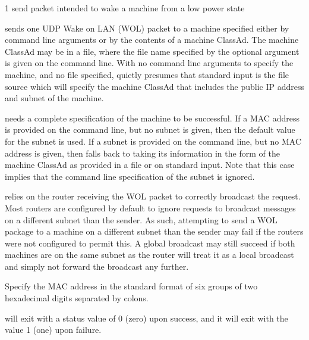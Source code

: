 \begin{ManPage}{\label{man-condor-power}}{1}
{send packet intended to wake a machine from a low power state}
\Synopsis 
{}




\Description

 sends one UDP Wake on LAN (WOL) packet to a machine
specified either by command line arguments or by the contents
of a machine ClassAd.
The machine ClassAd may be in a file, where the 
file name specified by the optional argument  
is given on the command line.
With no command line arguments to specify the machine,
and no file specified,  quietly presumes that standard input
is the file source which will
specify the machine ClassAd that includes the public IP address
and subnet of the machine.

 needs a complete specification of the machine to
be successful.
If a MAC address is provided on the command line, but no subnet is given,
then the default value for the subnet is used.
If a subnet is provided on the command line, but no MAC address is given,
then  falls back to taking its information in the form
of the machine ClassAd as provided in a file or on standard input.
Note that this case implies that the command line specification of the 
subnet is ignored.

 relies on the router receiving the WOL packet to correctly
broadcast the request. Most routers are configured by default to ignore
requests to broadcast messages on a different subnet than the sender. As
such, attempting to send a WOL package to a machine on a different subnet
than the sender may fail if the routers were not configured to permit this.
A global broadcast may still succeed if both machines are on the same subnet
as the router will treat it as a local broadcast and simply not forward
the broadcast any further.

\begin{Options}
   {Specify the MAC address in the standard
    format of six groups of two hexadecimal digits separated by colons. }

\end{Options}

\ExitStatus

 will exit with a status value of 0 (zero) upon success,
and it will exit with the value 1 (one) upon failure.

\end{ManPage}
